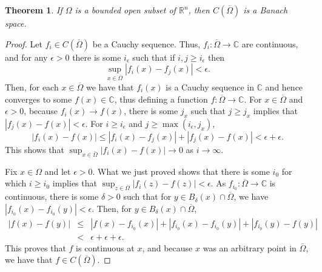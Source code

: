 \documentclass{article}
\newtheorem{theorem}{Theorem}
\begin{document}
\begin{theorem}
If $\Omega$ is a bounded open subset of $\mathbb{R}^n$, then $C(\overline{\Omega})$ is a Banach space.
\label{closedC0}
\end{theorem}
\begin{proof}
Let $f_i \in C(\overline{\Omega})$ be a Cauchy sequence. Thus, $f_i:\overline{\Omega} \to \mathbb{C}$ are continuous, and 
for any $\epsilon>0$ there is some $i_\epsilon$ such that if $i, j \geq i_\epsilon$ then
\[
\sup_{x \in \overline{\Omega}} |f_i(x)-f_j(x)|<\epsilon.
\]
Then, for each $x \in \overline{\Omega}$ we have that  $f_i(x)$ is a Cauchy sequence in $\mathbb{C}$ and hence converges to some
$f(x) \in \mathbb{C}$, thus defining a function $f:\overline{\Omega} \to \mathbb{C}$.
For $x \in \overline{\Omega}$ and $\epsilon>0$,
 because $f_i(x) \to f(x)$, there is some $j_x$ such that $j \geq j_x$ implies that $|f_j(x)-f(x)|<\epsilon$. For $i \geq i_\epsilon$ and $j \geq
 \max(i_\epsilon,j_x)$,
 \[
 |f_i(x)-f(x)| \leq |f_i(x)-f_j(x)| + |f_j(x)-f(x)| < \epsilon+\epsilon.
 \]
 This shows that $\sup_{x \in \overline{\Omega}}|f_i(x)-f(x)| \to 0$ as $i \to \infty$.

Fix $x \in \Omega$ and let $\epsilon>0$.
What we just proved shows that there is some $i_0$ for which $i \geq i_0$ implies that
$\sup_{z \in \overline{\Omega}} |f_i(z)-f(z)|<\epsilon$.
As $f_{i_0}: \overline{\Omega} \to \mathbb{C}$ is continuous, there is some $\delta>0$ such that
for $y \in B_\delta(x) \cap \overline{\Omega}$, we have $|f_{i_0}(x)-f_{i_0}(y)|<\epsilon$. Then, for $y \in
B_\delta(x) \cap \overline{\Omega}$,
\begin{eqnarray*}
|f(x)-f(y)| &\leq& |f(x)-f_{i_0}(x)|+|f_{i_0}(x)-f_{i_0}(y)| + |f_{i_0}(y)-f(y)|\\
&<&\epsilon+\epsilon+\epsilon.
\end{eqnarray*}
This proves that $f$ is continuous at $x$, and because $x$ was an arbitrary point in $\overline{\Omega}$, we have that
$f \in C(\overline{\Omega})$.
\end{proof}
\end{document}

